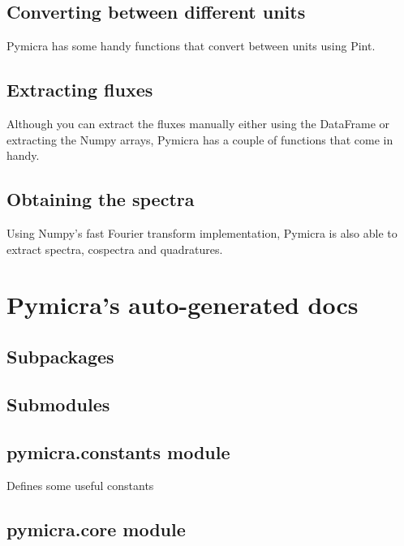 \documentclass[a4paper,10pt,english]{sphinxmanual}
\begin{document}
\subsection{Converting between different units}
\label{tutorial:converting-between-different-units}
Pymicra has some handy functions that convert between units using Pint.


\subsection{Extracting fluxes}
\label{tutorial:extracting-fluxes}
Although you can extract the fluxes manually either using the DataFrame or extracting
the Numpy arrays, Pymicra has a couple of functions that come in handy.


\subsection{Obtaining the spectra}
\label{tutorial:obtaining-the-spectra}
Using Numpy's fast Fourier transform implementation, Pymicra is also able to extract
spectra, cospectra and quadratures.


\section{Pymicra's auto-generated docs}
\label{pymicra:pymicra-s-auto-generated-docs}\label{pymicra::doc}

\subsection{Subpackages}
\label{pymicra:subpackages}

\subsection{Submodules}
\label{pymicra:submodules}

\subsection{pymicra.constants module}
\label{pymicra:module-pymicra.constants}\label{pymicra:pymicra-constants-module}
Defines some useful constants


\subsection{pymicra.core module}
\label{pymicra:module-pymicra.core}\label{pymicra:pymicra-core-module}
\end{document}
